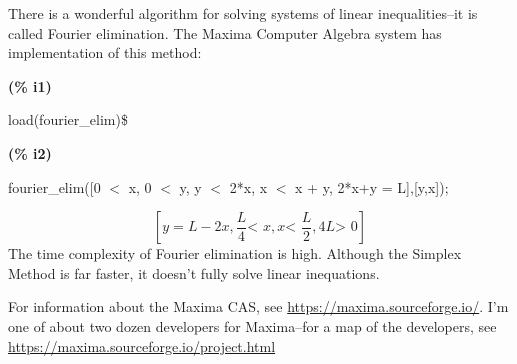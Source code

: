 \documentclass[12pt,fleqn,answers]{exam}
\begin{document}
\begin{questions}
\begin{solution}
\quad There is a wonderful algorithm for solving systems of 
linear inequalities--it is called Fourier elimination. 
The Maxima Computer Algebra system has implementation of this method:

\noindent
\begin{minipage}[t]{8em}\color{red}\bf
(\% i1) 
\end{minipage}
\begin{minipage}[t]{\textwidth}\color{blue}
load(fourier\_elim)\$


\end{minipage}

\noindent%


\noindent
\begin{minipage}[t]{8em}\color{red}\bf
(\% i2)
\end{minipage}
\begin{minipage}[t]{\textwidth}\color{blue}
fourier\_elim([0 \ensuremath{<} x, 0 \ensuremath{<} y, y \ensuremath{<} 2*x, x \ensuremath{<} x + y, 2*x+y = L],[y,x]);


\end{minipage}
\[\displaystyle \tag{\% o2} 
[y=L-2 x,\frac{L}{4}\mbox{<  }x,x\mbox{<  }\frac{L}{2},4 L\mbox{>  }0]\mbox{}
\]
The time complexity of Fourier elimination is high. Although the
Simplex Method is far faster, it doesn't fully solve linear 
inequations.  

\quad For information about the Maxima CAS, see
\url{https://maxima.sourceforge.io/}. I'm one of
about two dozen developers for Maxima--for a map of
the developers, see \url{https://maxima.sourceforge.io/project.html}

\end{solution}

\end{questions}
\end{document}
